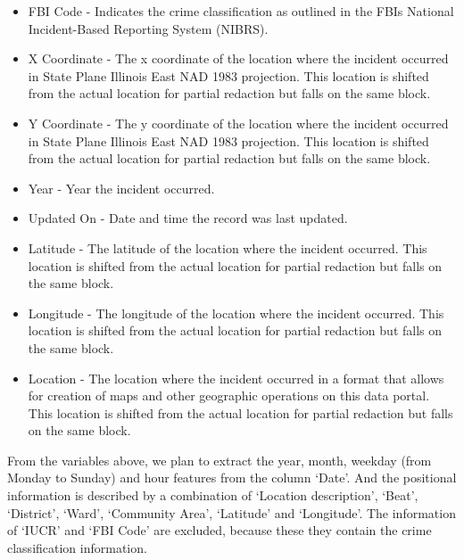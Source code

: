 \documentclass[12pt]{article}
\begin{document}
\begin{itemize}
\item FBI Code - Indicates the crime classification as outlined in the FBIs National Incident-Based Reporting System (NIBRS).
\item X Coordinate - The x coordinate of the location where the incident occurred in State Plane Illinois East NAD 1983 projection. This location is shifted from the actual location for partial redaction but falls on the same block.
\item Y Coordinate - The y coordinate of the location where the incident occurred in State Plane Illinois East NAD 1983 projection. This location is shifted from the actual location for partial redaction but falls on the same block.
\item Year - Year the incident occurred.
\item Updated On - Date and time the record was last updated.
\item Latitude - The latitude of the location where the incident occurred. This location is shifted from the actual location for partial redaction but falls on the same block.
\item Longitude - The longitude of the location where the incident occurred. This location is shifted from the actual location for partial redaction but falls on the same block.
\item Location - The location where the incident occurred in a format that allows for creation of maps and other geographic operations on this data portal. This location is shifted from the actual location for partial redaction but falls on the same block.
\end{itemize}

    From the variables above, we plan to extract the year, month, weekday (from Monday to Sunday) and hour features from the column ‘Date’. And the positional information is described by a combination of ‘Location description’, ‘Beat’, ‘District’, ‘Ward’, ‘Community Area’, ‘Latitude’ and ‘Longitude’.  The information of ‘IUCR’ and ‘FBI Code’ are excluded, because these they contain the crime classification information.
    
\end{document}
